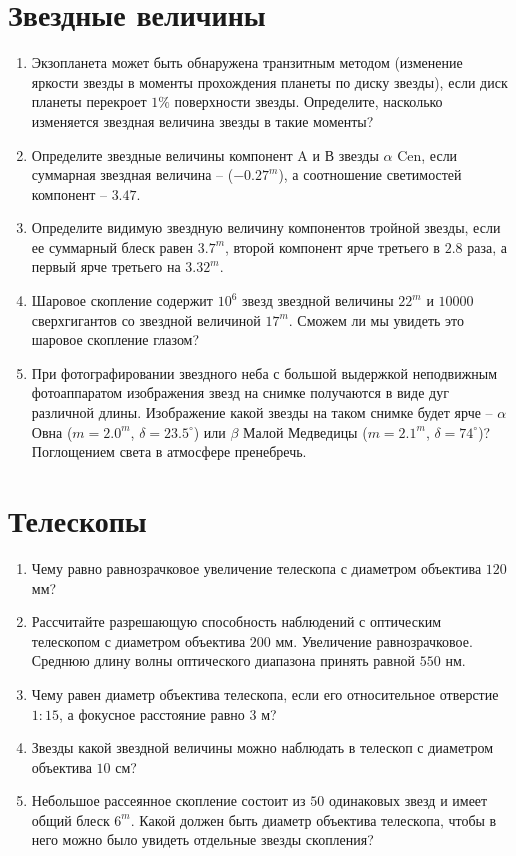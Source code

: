 \documentclass[12pt]{article}
\begin{document}
\section*{Звездные величины}
\begin{enumerate}[resume]
    \item{Экзопланета может быть обнаружена транзитным методом (изменение яркости звезды в моменты прохождения планеты по диску звезды), если диск планеты перекроет $1\%$ поверхности звезды. Определите, насколько изменяется звездная величина звезды в такие моменты?}
	\item{Определите звездные величины компонент A и В звезды $\alpha$ Cen, если суммарная звездная величина -- ($-0.27^m$), а соотношение светимостей компонент -- $3.47$.}
	\item{Определите видимую звездную величину компонентов тройной звезды, если ее суммарный блеск равен $3.7^m$, второй компонент ярче третьего в $2.8$ раза, а первый ярче третьего на $3.32^m$.}
	\item{Шаровое скопление содержит $10^{6}$ звезд звездной величины $22^m$ и $10 000$ сверхгигантов со звездной величиной $17^m$. Сможем ли мы увидеть это шаровое скопление глазом?}
	\item{При фотографировании звездного неба с большой выдержкой неподвижным фотоаппаратом изображения звезд на снимке получаются в виде дуг различной длины. Изображение какой звезды на таком снимке будет ярче -- $\alpha$ Овна ($m = 2.0^m$, $\delta=23.5^{\circ}$) или $\beta$ Малой Медведицы ($m = 2.1^m$, $\delta=74^{\circ}$)? Поглощением света в атмосфере пренебречь.}\
\end{enumerate}
\section*{Телескопы}
\begin{enumerate}[resume]
    \item Чему равно равнозрачковое увеличение телескопа с диаметром объектива $120$ мм?
    \item Рассчитайте разрешающую способность наблюдений с оптическим телескопом с диаметром объектива $200$ мм. Увеличение равнозрачковое.
    Среднюю длину волны оптического диапазона принять равной $550$ нм.
    \item Чему равен диаметр объектива телескопа, если его относительное отверстие $1:15$, а фокусное расстояние равно $3$ м?
    \item Звезды какой звездной величины можно наблюдать в телескоп с диаметром объектива $10$ см?
    \item Небольшое рассеянное скопление состоит из $50$ одинаковых звезд и имеет общий блеск $6^m$. Какой должен быть диаметр объектива телескопа, чтобы в него можно было увидеть отдельные звезды скопления?
\end{enumerate}
\end{document}
